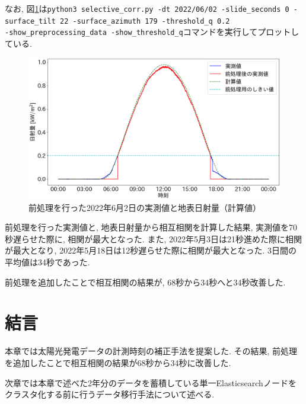 \clearpage

なお, 図\ref{2-p2}は\texttt{python3 selective_corr.py -dt 2022/06/02 -slide_seconds 0 -surface_tilt 22 -surface_azimuth 179 -threshold_q 0.2 \\ -show_preprocessing_data -show_threshold_q}コマンドを実行してプロットしている.

\begin{figure}[H]
  \begin{center}
    \includegraphics[width=140mm]{sotu/figure/2/drop-under-0.2-q.png}
    \caption{前処理を行った2022年6月2日の実測値と地表日射量（計算値）}
    \label{2-p2}
  \end{center}
\end{figure}

前処理を行った実測値と, 地表日射量から相互相関を計算した結果, 実測値を70秒遅らせた際に, 相関が最大となった. また, 2022年5月3日は21秒進めた際に相関が最大となり, 2022年5月18日は12秒遅らせた際に相関が最大となった. 3日間の平均値は34秒であった.

前処理を追加したことで相互相関の結果が, 68秒から34秒へと34秒改善した.

\section{結言}
本章では太陽光発電データの計測時刻の補正手法を提案した. その結果, 前処理を追加したことで相互相関の結果が68秒から34秒に改善した.

次章では本章で述べた2年分のデータを蓄積している単一Elasticsearchノードをクラスタ化する前に行うデータ移行手法について述べる.